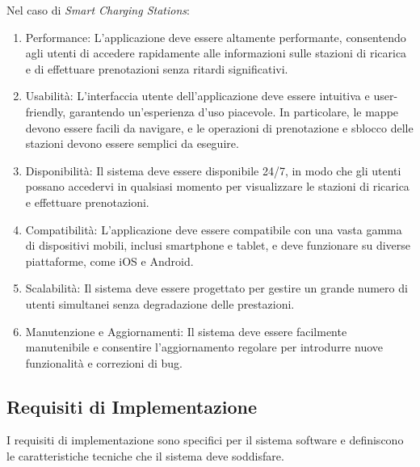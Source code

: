 Nel caso di \textit{Smart Charging Stations}:

\begin{enumerate}[label=\arabic*.]
    \item Performance: L'applicazione deve essere altamente performante, consentendo agli utenti
          di accedere rapidamente alle informazioni sulle stazioni di ricarica e di effettuare prenotazioni
          senza ritardi significativi.

    \item Usabilità: L'interfaccia utente dell'applicazione deve essere intuitiva e user-friendly,
          garantendo un'esperienza d'uso piacevole. In particolare, le mappe devono essere facili da navigare,
          e le operazioni di prenotazione e sblocco delle stazioni devono essere semplici da eseguire.

    \item Disponibilità: Il sistema deve essere disponibile 24/7, in modo che gli utenti possano accedervi
          in qualsiasi momento per visualizzare le stazioni di ricarica e effettuare prenotazioni.

    \item Compatibilità: L'applicazione deve essere compatibile con una vasta gamma di dispositivi mobili,
          inclusi smartphone e tablet, e deve funzionare su diverse piattaforme, come iOS e Android.

    \item Scalabilità: Il sistema deve essere progettato per gestire un grande numero di utenti simultanei
          senza degradazione delle prestazioni.

    \item Manutenzione e Aggiornamenti: Il sistema deve essere facilmente manutenibile e consentire
          l'aggiornamento regolare per introdurre nuove funzionalità e correzioni di bug.
\end{enumerate}

\subsection{Requisiti di Implementazione}
I requisiti di implementazione sono specifici per il sistema software e definiscono le caratteristiche tecniche che il sistema deve soddisfare.

